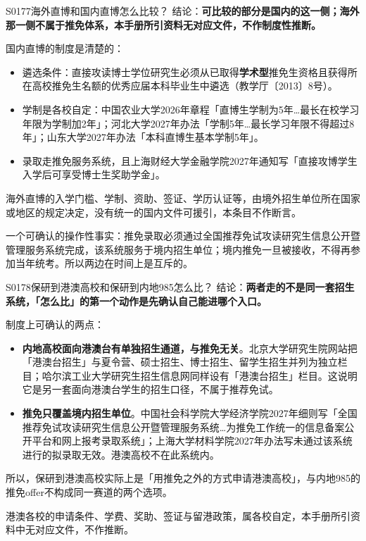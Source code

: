 \begin{qa}{S0177}{海外直博和国内直博怎么比较？}
结论：\textbf{可比较的部分是国内的这一侧；海外那一侧不属于推免体系，本手册所引资料无对应文件，不作制度性推断。}

国内直博的制度是清楚的：
\begin{itemize}
  \item 遴选条件：直接攻读博士学位研究生必须从已取得\textbf{学术型}推免生资格且获得所在高校推免生名额的优秀应届本科毕业生中遴选（教学厅〔2013〕8号）。
  \item 学制是各校自定：中国农业大学2026年章程「直博生学制为5年…最长在校学习年限为学制加2年」；河北大学2027年办法「学制5年…最长学习年限不得超过8年」；山东大学2027年办法「本科直博生基本学制5年」。
  \item 录取走推免服务系统，且上海财经大学金融学院2027年通知写「直接攻博学生入学后可享受博士生奖助学金」。
\end{itemize}

海外直博的入学门槛、学制、资助、签证、学历认证等，由境外招生单位所在国家或地区的规定决定，没有统一的国内文件可援引，本条目不作断言。

一个可确认的操作性事实：推免录取必须通过全国推荐免试攻读研究生信息公开暨管理服务系统完成，该系统服务于境内招生单位；境内推免一旦被接收，不得再参加当年统考。所以两边在时间上是互斥的。
\end{qa}

\begin{qa}{S0178}{保研到港澳高校和保研到内地985怎么比？}
结论：\textbf{两者走的不是同一套招生系统，「怎么比」的第一个动作是先确认自己能进哪个入口。}

制度上可确认的两点：
\begin{itemize}
  \item \textbf{内地高校面向港澳台有单独招生通道，与推免无关}。北京大学研究生院网站把「港澳台招生」与夏令营、硕士招生、博士招生、留学生招生并列为独立栏目；哈尔滨工业大学研究生招生信息网同样设有「港澳台招生」栏目。这说明它是另一套面向港澳台学生的招生口径，不属于推荐免试。
  \item \textbf{推免只覆盖境内招生单位}。中国社会科学院大学经济学院2027年细则写「全国推荐免试攻读研究生信息公开暨管理服务系统…为推免工作统一的信息备案公开平台和网上报考录取系统」；上海大学材料学院2027年办法写未通过该系统进行的拟录取无效。港澳高校不在此系统内。
\end{itemize}

所以，保研到港澳高校实际上是「用推免之外的方式申请港澳高校」，与内地985的推免offer不构成同一赛道的两个选项。

港澳各校的申请条件、学费、奖助、签证与留港政策，属各校自定，本手册所引资料中无对应文件，不作推断。
\end{qa}

